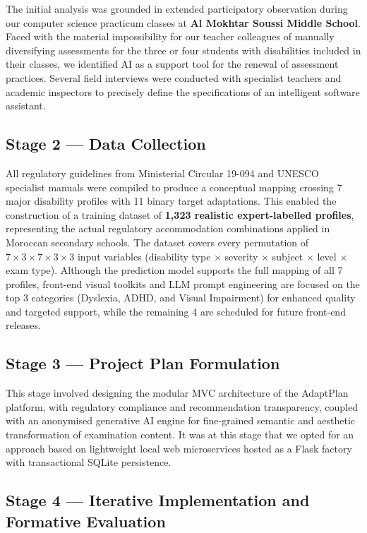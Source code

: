 \documentclass[12pt,a4paper]{report}
\begin{document}
The initial analysis was grounded in extended participatory observation during our computer science practicum classes at \textbf{Al Mokhtar Soussi Middle School}. Faced with the material impossibility for our teacher colleagues of manually diversifying assessments for the three or four students with disabilities included in their classes, we identified AI as a support tool for the renewal of assessment practices. Several field interviews were conducted with specialist teachers and academic inspectors to precisely define the specifications of an intelligent software assistant.

\subsection{Stage 2 — Data Collection}

All regulatory guidelines from Ministerial Circular 19-094 and UNESCO specialist manuals were compiled to produce a conceptual mapping crossing 7 major disability profiles with 11 binary target adaptations. This enabled the construction of a training dataset of \textbf{1,323 realistic expert-labelled profiles}, representing the actual regulatory accommodation combinations applied in Moroccan secondary schools. The dataset covers every permutation of $7 \times 3 \times 7 \times 3 \times 3$ input variables (disability type $\times$ severity $\times$ subject $\times$ level $\times$ exam type). Although the prediction model supports the full mapping of all 7 profiles, front-end visual toolkits and LLM prompt engineering are focused on the top 3 categories (Dyslexia, ADHD, and Visual Impairment) for enhanced quality and targeted support, while the remaining 4 are scheduled for future front-end releases.

\subsection{Stage 3 — Project Plan Formulation}

This stage involved designing the modular MVC architecture of the AdaptPlan platform, with regulatory compliance and recommendation transparency, coupled with an anonymised generative AI engine for fine-grained semantic and aesthetic transformation of examination content. It was at this stage that we opted for an approach based on lightweight local web microservices hosted as a Flask factory with transactional SQLite persistence.

\subsection{Stage 4 — Iterative Implementation and Formative Evaluation}
\end{document}
